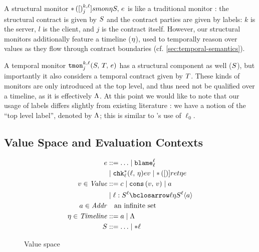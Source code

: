%
A structural monitor ${\tt *}{\,}({[})^{k,\ell}_{j}]{smon}{\eta}{S,\, e}$ is like a traditional monitor \cite{ianjohnson:dthf:complete}: the structural contract is given by $S$ and the contract parties are given by labels: $k$ is the server, $l$ is the client, and $j$ is the contract itself.
%
However, our structural monitors additionally feature a timeline ($\eta$), used to temporally reason over values as they flow through contract boundaries (cf. \autoref{sec:temporal-semantics}).
%

%
A temporal monitor ${\tt tmon}{^{k,\ell}_{j}}({S,\,T,\,e})$ has a structural component as well ($S$), but importantly it also considers a temporal contract given by $T$.
%
These kinds of monitors are only introduced at the top level, and thus need not be qualified over a timeline, as it is effectively $\Lambda$.
%
At this point we would like to note that our usage of labels differs slightly from existing literature \cite{ianjohnson:dthf:complete}: we have a notion of the ``top level label'', denoted by $\Lambda$; this is similar to \citeauthor{ianjohnson:dthf:complete}'s use of $\ell_0$.

\subsection{Value Space and Evaluation Contexts}

\begin{figure}
\begin{align*}
\mexp &::= \ldots
 \alt \sblame{\mmlab}{\mmlab} \\
&\alt \schk*{\mmlab}{\mmlab}{\mtimeline}{\mexp}{\mval}
 \alt \sret{\mmlab}{\mtimeline}{\mexp}
\\
\mval \in \Value &::=
      \mconstant
 \alt \vcons{\mval}{\mval}
 \alt \maddr \\
&\alt \bclos{\mmlab}{\mscon}{\mmlab}{\mmlab}{\mtimeline}{\mscon}{\mmlab}{\maddr}
\\
\maddr \in \Addr &\quad\text{an infinite set} \\
\mstimeline \in \Timeline &::= \maddr \alt \toplevel
\\
\mscon &::= \ldots
\alt \sown*{\sflat{\mexp}}{\mmlab}
\end{align*}
\caption{Value space}
\label{fig:values}
\end{figure}

